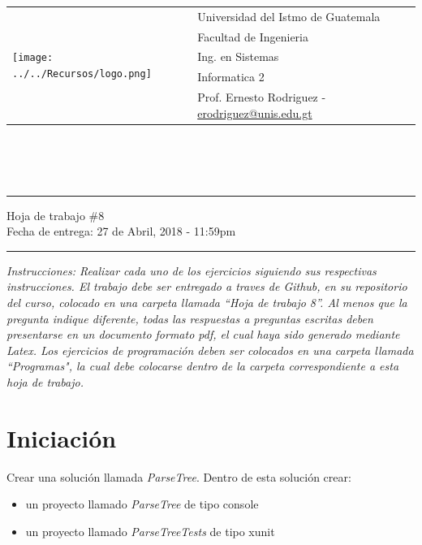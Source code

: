 \documentclass{article}
\newcommand{\horrule}[1]{\rule{\linewidth}{#1}}
\begin{document}
\begin{tabular}{l l}
\multirow{5}{*}{\texttt{[image: ../../Recursos/logo.png]}} & Universidad del Istmo de Guatemala \\
 & Facultad de Ingenieria \\
 & Ing. en Sistemas \\
 & Informatica 2 \\
 & Prof. Ernesto Rodriguez - \href{mailto:erodriguez@unis.edu.gt}{erodriguez@unis.edu.gt} \\
\end{tabular}
\\\\\\

\begin{center}
        \horrule{0.5pt}
        \huge{Hoja de trabajo \#8} \\
        \large{Fecha de entrega: 27 de Abril, 2018 - 11:59pm} \\
        \horrule{1pt}
\end{center}
\emph{Instrucciones: Realizar cada uno de los ejercicios siguiendo sus respectivas
instrucciones. El trabajo debe ser entregado a traves de Github, en su repositorio del curso, colocado en una carpeta llamada ``Hoja de trabajo 8''.
Al menos que la pregunta indique diferente, todas las respuestas a preguntas escritas deben presentarse en
un documento formato pdf, el cual haya sido generado mediante Latex. Los ejercicios de programaci\'on deben ser colocados en una carpeta
llamada ``Programas", la cual debe colocarse dentro de la carpeta correspondiente a esta hoja de trabajo.}

\section*{Iniciaci\'on}

Crear una soluci\'on llamada \emph{ParseTree}. Dentro de esta soluci\'on crear:
\begin{itemize}
        \item{un proyecto llamado \emph{ParseTree} de tipo console}
        \item{un proyecto llamado \emph{ParseTreeTests} de tipo xunit}
\end{itemize}
\end{document}
